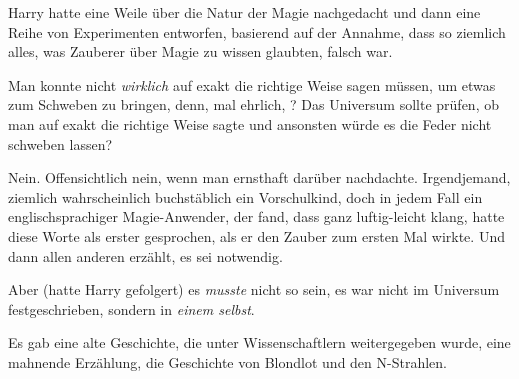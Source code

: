 Harry hatte eine Weile über die Natur der Magie nachgedacht und dann eine Reihe von Experimenten entworfen, basierend auf der Annahme, dass so ziemlich alles, was Zauberer über Magie zu wissen glaubten, falsch war.

Man konnte nicht \emph{wirklich}  auf exakt die richtige Weise sagen müssen, um etwas zum Schweben zu bringen, denn, mal ehrlich, ? Das Universum sollte prüfen, ob man  auf exakt die richtige Weise sagte und ansonsten würde es die Feder nicht schweben lassen?

Nein. Offensichtlich nein, wenn man ernsthaft darüber nachdachte. Irgendjemand, ziemlich wahrscheinlich buchstäblich ein Vorschulkind, doch in jedem Fall ein englischsprachiger Magie-Anwender, der fand, dass  ganz luftig-leicht klang, hatte diese Worte als erster gesprochen, als er den Zauber zum ersten Mal wirkte. Und dann allen anderen erzählt, es sei notwendig.

Aber (hatte Harry gefolgert) es \emph{musste} nicht so sein, es war nicht im Universum festgeschrieben, sondern in \emph{einem selbst}.

Es gab eine alte Geschichte, die unter Wissenschaftlern weitergegeben wurde, eine mahnende Erzählung, die Geschichte von Blondlot und den N-Strahlen.

